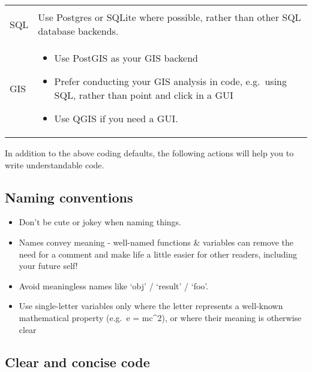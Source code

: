 \documentclass[]{book}
\providecommand{\tightlist}{%
  \setlength{\itemsep}{0pt}\setlength{\parskip}{0pt}}
\begin{document}
\begin{longtable}[]{@{}ll@{}}
\begin{minipage}[t]{0.67\columnwidth}
\end{minipage}\tabularnewline
\begin{minipage}[t]{0.27\columnwidth}\raggedright
SQL\strut
\end{minipage} & \begin{minipage}[t]{0.67\columnwidth}\raggedright
Use Postgres or SQLite where possible, rather than other SQL database backends.\strut
\end{minipage}\tabularnewline
\begin{minipage}[t]{0.27\columnwidth}\raggedright
GIS\strut
\end{minipage} & \begin{minipage}[t]{0.67\columnwidth}\raggedright
\begin{itemize}
\tightlist
\item
  Use PostGIS as your GIS backend
\item
  Prefer conducting your GIS analysis in code, e.g.~using SQL, rather than point and click in a GUI
\item
  Use QGIS if you need a GUI.
\end{itemize}\strut
\end{minipage}\tabularnewline
\bottomrule
\end{longtable}

In addition to the above coding defaults, the following actions will help you to write understandable code.

\hypertarget{names}{%
\subsection*{Naming conventions}\label{names}}

\begin{itemize}
\tightlist
\item
  Don't be cute or jokey when naming things.
\item
  Names convey meaning - well-named functions \& variables can remove the need for a comment and make life a little easier for other readers, including your future self!
\item
  Avoid meaningless names like `obj' / `result' / `foo'.
\item
  Use single-letter variables only where the letter represents a well-known mathematical property (e.g.~e = mc\^{}2), or where their meaning is otherwise clear
\end{itemize}

\hypertarget{ccc}{%
\subsection*{Clear and concise code}\label{ccc}}
\end{document}
